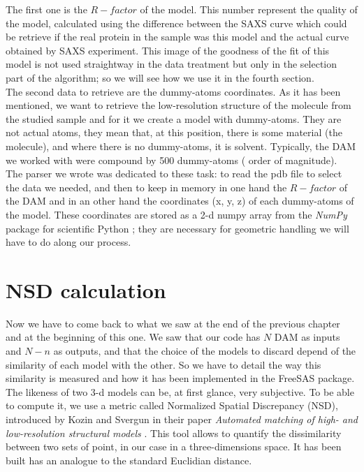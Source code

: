 \documentclass[a4paper, 11pt]{report}
\begin{document}
The first one is the $R-factor$ of the model. 
This number represent the quality of the model, calculated using the 
difference between the SAXS curve which could be retrieve if the real 
protein in the sample was this model and the actual curve obtained by 
SAXS experiment. 
This image of the goodness of the fit of this model is not used 
straightway in the data treatment but only in the selection part of 
the algorithm; so we will see how we use it in the fourth section.\\

The second data to retrieve are the dummy-atoms coordinates. 
As it has been mentioned, we want to retrieve the low-resolution 
structure of the molecule from the studied sample and for it we create 
a model with dummy-atoms. 
They are not actual atoms, they mean that, at this position, there is 
some material (the molecule), and where there is no dummy-atoms, it is 
solvent. 
Typically, the DAM we worked with were compound by 500 dummy-atoms (
order of magnitude).\\
The parser we wrote was dedicated to these task: to read the pdb file 
to select the data we needed, and then to keep in memory in one hand 
the $R-factor$ of the DAM and in an other hand the coordinates (x, y, 
z) of each dummy-atoms of the model. 
These coordinates are stored as a 2-d numpy array from the 
\textit{NumPy} package for scientific Python \cite{numpy}; they are 
necessary for geometric handling we will have to do along our process.

\section{NSD calculation}

Now we have to come back to what we saw at the end of the previous 
chapter and at the beginning of this one. 
We saw that our code has $N$ DAM as inputs and $N - n$ as outputs, and 
that the choice of the models to discard depend of the similarity of 
each model with the other. 
So we have to detail the way this similarity is measured and how it 
has been implemented in the FreeSAS package.\\

The likeness of two 3-d models can be, at first glance, very 
subjective. 
To be able to compute it, we use a metric called Normalized Spatial 
Discrepancy (NSD), introduced by Kozin and Svergun in their paper 
\textit{Automated matching of high- and low-resolution structural 
models} \cite{supcomb}. 
This tool allows to quantify the dissimilarity between two sets of 
point, in our case in a three-dimensions space. 
It has been built has an analogue to the standard Euclidian distance.\\
\end{document}
